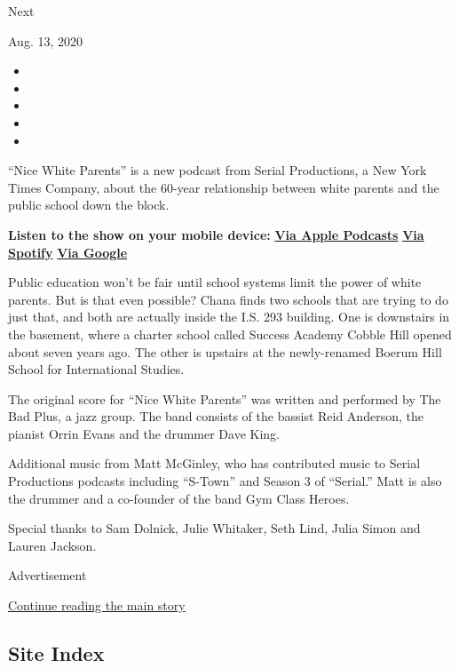Next

Aug. 13, 2020

\begin{itemize}
\item
\item
\item
\item
\item
\end{itemize}

``Nice White Parents'' is a new podcast from Serial Productions, a New
York Times Company, about the 60-year relationship between white parents
and the public school down the block.

\textbf{Listen to the show on your mobile device:}
\textbf{\href{https://podcasts.apple.com/us/podcast/nice-white-parents/id1524080195}{Via
Apple Podcasts}} \textbf{\textbar{}}
\textbf{\href{https://open.spotify.com/show/7oBSLCZFCgpdCaBjIG8mLV?si=YcEPLD3xT2ejXmpQz-tRpw}{Via
Spotify}} \textbf{\textbar{}}
\textbf{\href{https://podcasts.google.com/feed/aHR0cHM6Ly9yc3MuYXJ0MTkuY29tL25pY2Utd2hpdGUtcGFyZW50cw}{Via
Google}}

Public education won't be fair until school systems limit the power of
white parents. But is that even possible? Chana finds two schools that
are trying to do just that, and both are actually inside the I.S. 293
building. One is downstairs in the basement, where a charter school
called Success Academy Cobble Hill opened about seven years ago. The
other is upstairs at the newly-renamed Boerum Hill School for
International Studies.

The original score for ``Nice White Parents'' was written and performed
by The Bad Plus, a jazz group. The band consists of the bassist Reid
Anderson, the pianist Orrin Evans and the drummer Dave King.

Additional music from Matt McGinley, who has contributed music to Serial
Productions podcasts including ``S-Town'' and Season 3 of ``Serial.''
Matt is also the drummer and a co-founder of the band Gym Class Heroes.

Special thanks to Sam Dolnick, Julie Whitaker, Seth Lind, Julia Simon
and Lauren Jackson.

Advertisement

\protect\hyperlink{after-bottom}{Continue reading the main story}

\hypertarget{site-index}{%
\subsection{Site Index}\label{site-index}}

